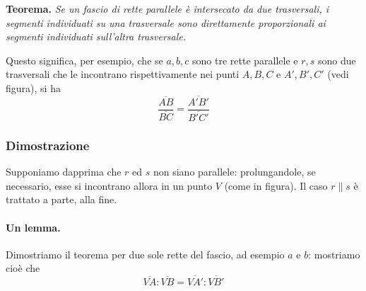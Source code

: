 \documentclass[a4paper,12pt]{article}
\theoremstyle{definition}
\theoremstyle{remark}
\begin{document}
\medskip
\noindent\textbf{Teorema.} \textit{Se un fascio di rette parallele è intersecato da due trasversali, i segmenti individuati su una trasversale sono direttamente proporzionali ai segmenti individuati sull'altra trasversale.}
\medskip

Questo significa, per esempio, che se $a, b, c$ sono tre rette parallele e $r, s$ sono due trasversali che le incontrano rispettivamente nei punti $A,B,C$ e $A',B',C'$ (vedi figura), si ha
$$\frac{\overline{AB}}{\overline{BC}} = \frac{\overline{A'B'}}{\overline{B'C'}}$$

\subsubsection*{Dimostrazione}

Supponiamo dapprima che $r$ ed $s$ non siano parallele: prolungandole, se necessario, esse si incontrano allora in un punto $V$ (come in figura). Il caso $r \parallel s$ è trattato a parte, alla fine.

\paragraph{Un lemma.} Dimostriamo il teorema per due sole rette del fascio, ad esempio $a$ e $b$: mostriamo cioè che
$$\overline{VA} : \overline{VB} = \overline{VA'} : \overline{VB'}$$

\begin{center}
\end{center}
\end{document}
